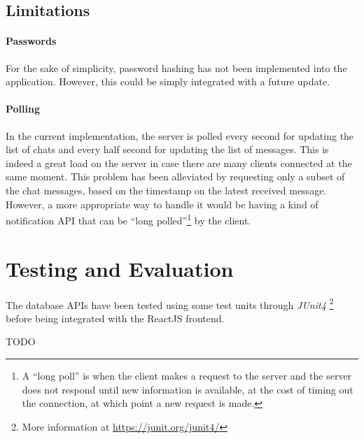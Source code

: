 \documentclass[10pt]{article}
\begin{document}
\subsection{Limitations}
\paragraph{Passwords}
For the sake of simplicity, password hashing has not been implemented into the 
application. However, this could be simply integrated with a future update.

\paragraph{Polling}
In the current implementation, the server is polled every second for updating 
the list of chats and every half second for updating the list of messages. This 
is indeed a great load on the server in case there are many clients connected 
at the same moment. 
This problem has been alleviated by requesting only a subset of the chat 
messages, based on the timestamp on the latest received message.
However, 
a more appropriate way to handle it would be having a kind of notification API
that can be ``long polled''\footnote{A ``long poll'' is when the client 
makes a request to the server and the server does not respond until new 
information is available, at the cost of timing out the connection, at which 
point a new request is made.} by the client.

\section{Testing and Evaluation}

The database APIs have been tested using some test units through \emph{JUnit4}
\footnote{More information at \url{https://junit.org/junit4/}} before being 
integrated with the ReactJS frontend.

TODO
\end{document}
